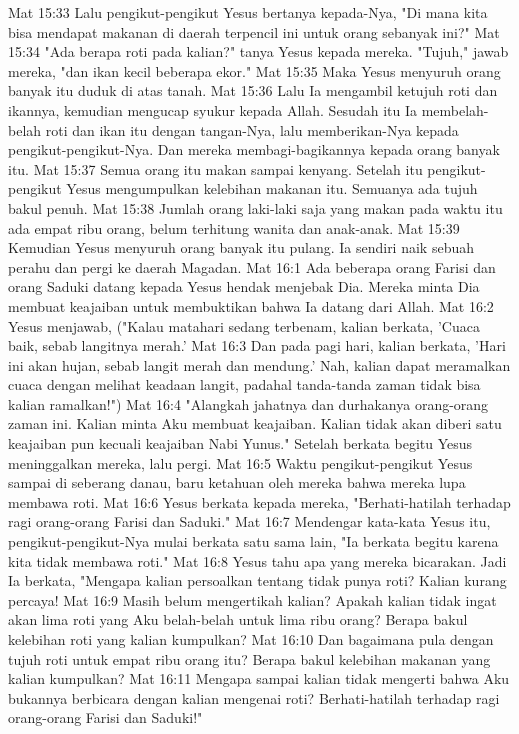 Mat 15:33  Lalu pengikut-pengikut Yesus bertanya kepada-Nya, "Di mana kita bisa mendapat makanan di daerah terpencil ini untuk orang sebanyak ini?"
Mat 15:34  "Ada berapa roti pada kalian?" tanya Yesus kepada mereka. "Tujuh," jawab mereka, "dan ikan kecil beberapa ekor."
Mat 15:35  Maka Yesus menyuruh orang banyak itu duduk di atas tanah.
Mat 15:36  Lalu Ia mengambil ketujuh roti dan ikannya, kemudian mengucap syukur kepada Allah. Sesudah itu Ia membelah-belah roti dan ikan itu dengan tangan-Nya, lalu memberikan-Nya kepada pengikut-pengikut-Nya. Dan mereka membagi-bagikannya kepada orang banyak itu.
Mat 15:37  Semua orang itu makan sampai kenyang. Setelah itu pengikut-pengikut Yesus mengumpulkan kelebihan makanan itu. Semuanya ada tujuh bakul penuh.
Mat 15:38  Jumlah orang laki-laki saja yang makan pada waktu itu ada empat ribu orang, belum terhitung wanita dan anak-anak.
Mat 15:39  Kemudian Yesus menyuruh orang banyak itu pulang. Ia sendiri naik sebuah perahu dan pergi ke daerah Magadan.
Mat 16:1  Ada beberapa orang Farisi dan orang Saduki datang kepada Yesus hendak menjebak Dia. Mereka minta Dia membuat keajaiban untuk membuktikan bahwa Ia datang dari Allah.
Mat 16:2  Yesus menjawab, ("Kalau matahari sedang terbenam, kalian berkata, 'Cuaca baik, sebab langitnya merah.'
Mat 16:3  Dan pada pagi hari, kalian berkata, 'Hari ini akan hujan, sebab langit merah dan mendung.' Nah, kalian dapat meramalkan cuaca dengan melihat keadaan langit, padahal tanda-tanda zaman tidak bisa kalian ramalkan!")
Mat 16:4  "Alangkah jahatnya dan durhakanya orang-orang zaman ini. Kalian minta Aku membuat keajaiban. Kalian tidak akan diberi satu keajaiban pun kecuali keajaiban Nabi Yunus." Setelah berkata begitu Yesus meninggalkan mereka, lalu pergi.
Mat 16:5  Waktu pengikut-pengikut Yesus sampai di seberang danau, baru ketahuan oleh mereka bahwa mereka lupa membawa roti.
Mat 16:6  Yesus berkata kepada mereka, "Berhati-hatilah terhadap ragi orang-orang Farisi dan Saduki."
Mat 16:7  Mendengar kata-kata Yesus itu, pengikut-pengikut-Nya mulai berkata satu sama lain, "Ia berkata begitu karena kita tidak membawa roti."
Mat 16:8  Yesus tahu apa yang mereka bicarakan. Jadi Ia berkata, "Mengapa kalian persoalkan tentang tidak punya roti? Kalian kurang percaya!
Mat 16:9  Masih belum mengertikah kalian? Apakah kalian tidak ingat akan lima roti yang Aku belah-belah untuk lima ribu orang? Berapa bakul kelebihan roti yang kalian kumpulkan?
Mat 16:10  Dan bagaimana pula dengan tujuh roti untuk empat ribu orang itu? Berapa bakul kelebihan makanan yang kalian kumpulkan?
Mat 16:11  Mengapa sampai kalian tidak mengerti bahwa Aku bukannya berbicara dengan kalian mengenai roti? Berhati-hatilah terhadap ragi orang-orang Farisi dan Saduki!"
